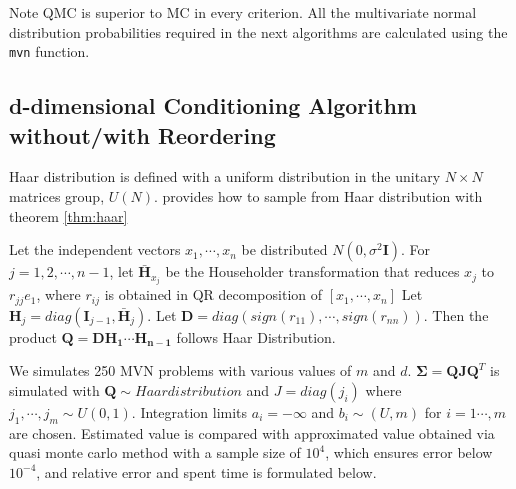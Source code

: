 Note QMC is superior to MC in every criterion. All the multivariate normal distribution probabilities required in the next algorithms are calculated using the \texttt{mvn} function.

\subsection{d-dimensional Conditioning Algorithm without/with Reordering}

Haar distribution is defined with a uniform distribution in the unitary $N\times N$ matrices group, $U(N)$.
\citet{stewart1980efficient} provides how to sample from Haar distribution with theorem \ref{thm:haar}

\begin{theorem}\label{thm:haar}\citet{stewart1980efficient}
	Let the independent vectors $x_1,\cdots,x_{n}$ be distributed $N(0,\sigma^2 \mathbf{I})$. For $j=1,2,\cdots,n-1$, let $\mathbf{\bar{H}}_{x_j}$ be the Householder transformation that reduces $x_j$ to $r_{jj}e_1$, where $r_{ij}$ is obtained in QR decomposition of $[x_1,\cdots,x_n]$ Let $\mathbf{H}_j=diag(\mathbf{I}_{j-1},\bar{\mathbf{H}}_j)$. Let $\mathbf{D}=diag(sign(r_{11}), \cdots, sign(r_{nn}))$. Then the product $\mathbf{Q}=\mathbf{DH_1\cdots H_{n-1}}$ follows Haar Distribution.
\end{theorem}

We simulates 250 MVN problems with various values of $m$ and $d$. $\boldsymbol{\Sigma}=\mathbf{Q}\mathbf{J}\mathbf{Q}^T$ is simulated with $\mathbf{Q}\sim{Haar distribution}$ and $J=diag(j_i)$ where $j_1,\cdots,j_m\sim U(0,1)$. Integration limits $a_i=-\infty$ and $b_i\sim(U,m)$ for $i=1\cdots,m$ are chosen. Estimated value is compared with approximated value obtained via quasi monte carlo method with a sample size of $10^4$, which ensures error below $10^{-4}$, and relative error and spent time is formulated below.

